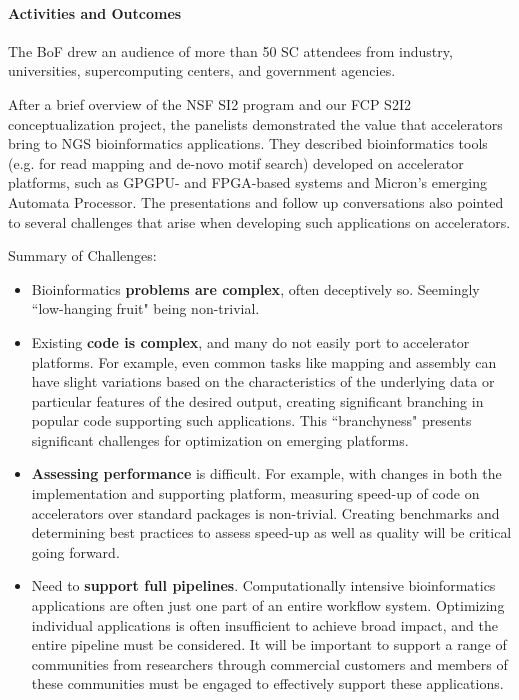\paragraph{Activities and Outcomes}
The BoF drew an audience of more than 50 SC attendees from industry, universities, supercomputing centers, and government agencies.

After a brief overview of the NSF SI2 program and our FCP S2I2 conceptualization project, the panelists demonstrated the value that accelerators bring to NGS bioinformatics applications. They described bioinformatics tools (e.g. for read mapping and de-novo motif search) developed on accelerator platforms, such as GPGPU- and FPGA-based systems and Micron's emerging Automata Processor. The presentations and follow up conversations also pointed to several challenges that arise when developing such applications on accelerators. 

Summary of Challenges:
\begin{itemize}
\item	Bioinformatics \textbf{problems are complex}, often deceptively so. Seemingly ``low-hanging fruit" being non-trivial.

\item	Existing \textbf{code is complex}, and many do not easily port to accelerator platforms. For example, even common tasks like mapping and assembly can have slight variations based on the characteristics of the underlying data or particular features of the desired output, creating significant branching in popular code supporting such applications.  This ``branchyness" presents significant challenges for optimization on emerging platforms. 
	
\item \textbf{Assessing performance} is difficult. For example, with changes in both the implementation and supporting platform, measuring speed-up of code on accelerators over standard packages is non-trivial. Creating benchmarks and determining best practices to assess speed-up as well as quality will be critical going forward.

\item	Need to \textbf{support full pipelines}. Computationally intensive bioinformatics applications are often just one part of an entire workflow system. Optimizing individual applications is often insufficient to achieve broad impact, and the entire pipeline must be considered. It will be important to support a range of communities from researchers through commercial customers and members of these communities must be engaged to effectively support these applications.
\end{itemize}

